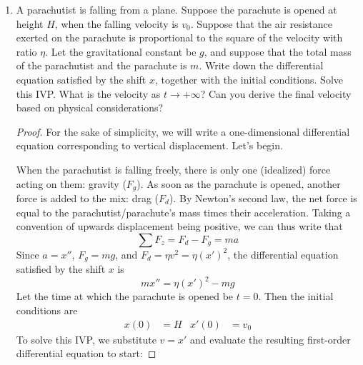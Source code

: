 \documentclass[../psets.tex]{subfiles}
\begin{document}
\begin{enumerate}
\begin{proof}
        The amount of time it takes for the capacitor to charge to 98\% under the given conditions ($R=\SI{e3}{\ohm}$ and $C=\SI{e-6}{\farad}$) may be determined as follows.
        \begin{align*}
            0.98 &= 1-\e[-t/RC]\\
            t &= -RC\ln(0.02)\\
            \Aboxed{t &= \SI{3.9e-3}{\second}}
        \end{align*}
    \end{proof}
    \item A parachutist is falling from a plane. Suppose the parachute is opened at height $H$, when the falling velocity is $v_0$. Suppose that the air resistance exerted on the parachute is proportional to the square of the velocity with ratio $\eta$. Let the gravitational constant be $g$, and suppose that the total mass of the parachutist and the parachute is $m$. Write down the differential equation satisfied by the shift $x$, together with the initial conditions. Solve this IVP. What is the velocity as $t\to +\infty$? Can you derive the final velocity based on physical considerations?
    \begin{proof}
        For the sake of simplicity, we will write a one-dimensional differential equation corresponding to vertical displacement. Let's begin.\par
        When the parachutist is falling freely, there is only one (idealized) force acting on them: gravity ($F_g$). As soon as the parachute is opened, another force is added to the mix: drag ($F_d$). By Newton's second law, the net force is equal to the parachutist/parachute's mass times their acceleration. Taking a convention of upwards displacement being positive, we can thus write that
        \begin{equation*}
            \sum F_z = F_d-F_g = ma
        \end{equation*}
        Since $a=x''$, $F_g=mg$, and $F_d=\eta v^2=\eta(x')^2$, the differential equation satisfied by the shift $x$ is
        \begin{equation*}
            mx'' = \eta(x')^2-mg
        \end{equation*}
        Let the time at which the parachute is opened be $t=0$. Then the initial conditions are
        \begin{align*}
            x(0) &= H&
            x'(0) &= v_0
        \end{align*}
        To solve this IVP, we substitute $v=x'$ and evaluate the resulting first-order differential equation to start:

\end{proof}
\end{enumerate}
\end{document}
